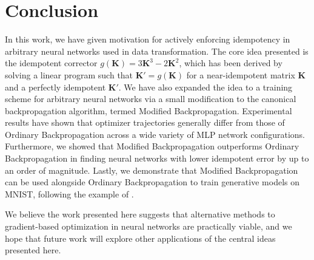 \documentclass{article}
\theoremstyle{plain}
\theoremstyle{definition}
\theoremstyle{remark}
\newcommand{\vK}{\mathbf{K}}
\begin{document}
\section{Conclusion}
\label{sec:conclusion}
In this work, we have given motivation for actively enforcing idempotency in arbitrary neural networks used in data transformation. The core idea presented is the idempotent corrector $g(\vK) = 3\vK^3 - 2\vK^2$, which has been derived by solving a linear program such that $\vK' = g(\vK)$ for a near-idempotent matrix $\vK$ and a perfectly idempotent $\vK'$. We have also expanded the idea to a training scheme for arbitrary neural networks via a small modification to the canonical backpropagation algorithm, termed Modified Backpropagation. Experimental results have shown that optimizer trajectories generally differ from those of Ordinary Backpropagation across a wide variety of MLP network configurations. Furthermore, we showed that Modified Backpropagation outperforms Ordinary Backpropagation in finding neural networks with lower idempotent error by up to an order of magnitude. Lastly, we demonstrate that Modified Backpropagation can be used alongside Ordinary Backpropagation to train generative models on MNIST, following the example of \citealt{shocher-ign}.

We believe the work presented here suggests that alternative methods to gradient-based optimization in neural networks are practically viable, and we hope that future work will explore other applications of the central ideas presented here.

%
%
\end{document}
